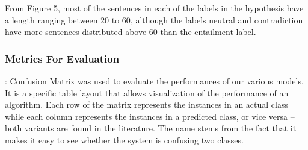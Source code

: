 \documentclass[runningheads]{llncs}
\begin{document}
From Figure 5, most of the sentences in each of the labels in the hypothesis have a length ranging between 20 to 60, although the labels neutral and contradiction have more sentences distributed above 60 than the entailment label.
\subsubsection{Metrics For Evaluation}{:}
Confusion Matrix was used to evaluate the performances of our various models. It is a specific table layout that allows visualization of the performance of an algorithm. Each row of the matrix represents the instances in an actual class while each column represents the instances in a predicted class, or vice versa – both variants are found in the literature. The name stems from the fact that it makes it easy to see whether the system is confusing two classes.
\end{document}

